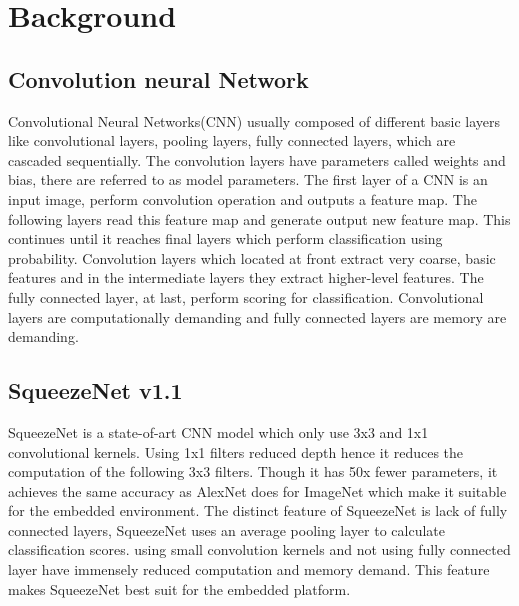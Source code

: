 \documentclass[conference]{IEEEtran}
\begin{document}
\section{Background}
\subsection{Convolution neural Network}
Convolutional Neural Networks(CNN) usually composed of different basic layers like convolutional layers, pooling layers, fully connected layers, which are cascaded sequentially. The convolution layers have parameters called weights and bias, there are referred to as model parameters. The first layer of a CNN is an input image, perform convolution operation and outputs a feature map. The following layers read this feature map and generate output new feature map. This continues until it reaches final layers which perform classification using probability. Convolution layers which located at front extract very coarse, basic features and in the intermediate layers they extract higher-level features. The fully connected layer, at last, perform scoring for classification. Convolutional layers are computationally demanding and fully connected layers are memory are demanding. 

\subsection{SqueezeNet v1.1}
SqueezeNet is a state-of-art CNN model which only use 3x3 and 1x1 convolutional kernels. Using 1x1 filters reduced depth hence it reduces the computation of the following 3x3 filters. Though it has 50x fewer parameters, it achieves the same accuracy as AlexNet does for ImageNet which make it suitable for the embedded environment. The distinct feature of SqueezeNet is lack of fully connected layers, SqueezeNet uses an average pooling layer to calculate classification scores. using small convolution kernels and not using fully connected layer have immensely reduced computation and memory demand. This feature makes SqueezeNet best suit for the embedded platform.
\end{document}
